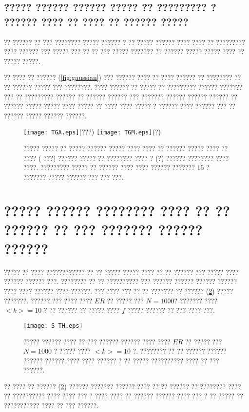 \subsection{????? ?????? ?????? ????? ?? ????????? ? ?????? ???? ?? ???? ?? ?????? ?????}
 ?? ?????? ?? ??? ???????? ????? ?????? ? ?? ????? ?????? ???? ???? ?? ????????? ???? ?????? ??? ????? ??? ?? ?? ??? ????? ??????? ?? ?????? ????? ????? ???? ?? ????? ?????.

 ?? ???? ?? ?????? (\ref{fig:gaussian}) ??? ?????? ???? ?? ???? ?????? ?? ???????? ?? ?? ?????? ????? ??? ????????. ???? ?????? ?? ????? ?? ????????? ?????? ??????? ??? ?? ????????? ?????? ?? ?????? ?????? ??? ??????? ?????? ?????? ?????? ?? ?????? ????? ????? ???? ????? ?? ???? ???? ????? ? ?????? ???? ?????? ??? ?? ?????? ????? ?????? ??????.

\begin{figure}[htbp]
\hspace*{0cm}
\centering
\texttt{[image: TGA.eps]}\centering(???)    
\texttt{[image: TGM.eps]}\centering(?)
\caption [????? ????? ?? ????? ?????? ????? ?? ?????? ?????]{\footnotesize ????? ????? ?? ????? ?????? ????? ???? ???? ?? ?????? ????? ???? ?? ???? (
???) ?????? ????? ?? ???????? ???? ? (?) ?????? ???????? ???? ????. ????????? ????? ?? ?????? ???? ???? ?????? ??????? $15$ ? ??????? ????? ?????? ??? ??? ???.}
\label{fig:gauss}
\end{figure}

\newpage
\section{????? ?????? ???????? ???? ?? ?? ?????? ?? ??? ??????? ?????? ??????}
????? ?? ???? ???????????? ?? ?? ????? ????? ???? ?? ?? ?????? ??? ????? ???? ?????? ?????? ???. ???????? ?? ?? ?????????? ??? ?????? ?????? ?????? ?????? ???? ???? ?????? ???? ??????. ??? ???? ??? ?? ?? ??????? ?? ?????? (\ref{fig:SM})   ????? ???????. ?????? ??? ???? ???? $ER$ ?? ????? ??? $N = 1000$? ??????? ???? $<k> = 10$ ? ?? ?????? ?? ????? ???? $f$ ????? ?????? ?? ??? ???? ???. 
\begin{figure}[htbp]
\hspace*{0cm}
\centering
\texttt{[image: S\_TH.eps]}
\caption [????? ?????? ???? ?? ??? ?????? ?????? ???? ???? $ER$ ?? ?????? ?????]{\footnotesize ????? ?????? ???? ?? ??? ?????? ?????? ???? ???? $ER$ ?? ????? ??? $N = 1000$ ? ????? ???? $<k> = 10$ ?. ???????? ?? ?? ?????? ?????? ?????? ?????? ???? ???? ?????? ? ?? ????? ?????????? ???? ?? ??? ??????. }
\label{fig:SM}
\end{figure}
?? ???? ?? ?????? (\ref{fig:SM})  ?????? ??????? ?????? ???? ?? ?? ?????? ?? ???????? ???? ?? ?????????? ???? ???? ??? ? ???? ???? ?? ?????? ?????? ???? ??? ? ?? ????? ?? ??????????? ???? ?? ??? ??????. 

